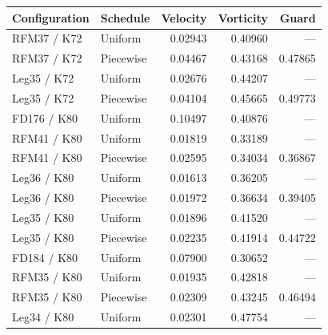\begin{tabularx}{\linewidth}{@{}Xlrrr@{}}
\toprule
Configuration & Schedule & Velocity & Vorticity & Guard \\
\midrule
RFM37 / K72 & Uniform & 0.02943 & 0.40960 & — \\
RFM37 / K72 & Piecewise & 0.04467 & 0.43168 & 0.47865 \\
Leg35 / K72 & Uniform & 0.02676 & 0.44207 & — \\
Leg35 / K72 & Piecewise & 0.04104 & 0.45665 & 0.49773 \\
FD176 / K80 & Uniform & 0.10497 & 0.40876 & — \\
RFM41 / K80 & Uniform & 0.01819 & 0.33189 & — \\
RFM41 / K80 & Piecewise & 0.02595 & 0.34034 & 0.36867 \\
Leg36 / K80 & Uniform & 0.01613 & 0.36205 & — \\
Leg36 / K80 & Piecewise & 0.01972 & 0.36634 & 0.39405 \\
Leg35 / K80 & Uniform & 0.01896 & 0.41520 & — \\
Leg35 / K80 & Piecewise & 0.02235 & 0.41914 & 0.44722 \\
FD184 / K80 & Uniform & 0.07900 & 0.30652 & — \\
RFM35 / K80 & Uniform & 0.01935 & 0.42818 & — \\
RFM35 / K80 & Piecewise & 0.02309 & 0.43245 & 0.46494 \\
Leg34 / K80 & Uniform & 0.02301 & 0.47754 & — \\
\bottomrule
\end{tabularx}
